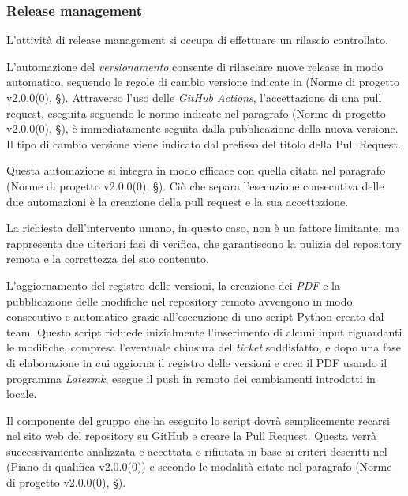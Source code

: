 \documentclass[10pt, a4paper]{article}
\begin{document}
\subsubsection{Release management}
L'attività di release management si occupa di effettuare un rilascio controllato.

L'automazione del \textit{versionamento\pg} consente di rilasciare nuove release in modo automatico, seguendo le regole di
cambio versione indicate in (Norme di progetto v2.0.0(0), \S {}). Attraverso l'uso delle \textit{GitHub Actions\pg}, l'accettazione di una pull request, 
eseguita seguendo le norme indicate nel paragrafo (Norme di progetto v2.0.0(0), \S {}), è immediatamente seguita dalla pubblicazione della nuova versione.
Il tipo di cambio versione viene indicato dal prefisso del titolo della Pull Request.

Questa automazione si integra in modo efficace con quella citata nel paragrafo (Norme di progetto v2.0.0(0), \S {}).
Ciò che separa l'esecuzione consecutiva delle due automazioni è la creazione della pull request e la sua accettazione.

La richiesta dell'intervento umano, in questo caso, non è un fattore limitante, ma rappresenta due ulteriori fasi di
verifica, che garantiscono la pulizia del repository remota e la correttezza del suo contenuto.

\label{sec:automazione_docs}
L'aggiornamento del registro delle versioni, la creazione dei \textit{PDF\pg} e la pubblicazione delle modifiche nel repository remoto avvengono in modo consecutivo e automatico grazie all'esecuzione di uno script Python creato dal team.
Questo script richiede inizialmente l'inserimento di alcuni input riguardanti le modifiche, compresa l'eventuale chiusura del \textit{ticket} soddisfatto, e dopo una fase di elaborazione
in cui aggiorna il registro delle versioni e crea il PDF usando il programma \textit{Latexmk}, esegue il push in remoto dei cambiamenti introdotti in locale.

Il componente del gruppo che ha eseguito lo script dovrà semplicemente recarsi nel
sito web del repository su GitHub e creare la Pull Request.
Questa verrà successivamente analizzata e accettata o rifiutata in base ai criteri descritti nel (Piano di qualifica v2.0.0(0)) e
secondo le modalità citate nel paragrafo (Norme di progetto v2.0.0(0), \S {}).
\end{document}
